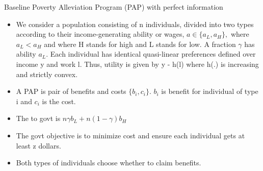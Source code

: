\documentclass{beamer}
\begin{document}
\begin{frame}[allowframebreaks]{Baseline Poverty Alleviation Program (PAP) with perfect information}
\begin{itemize}
    \item We consider a population consisting of n
 individuals, divided into two types according
 to their income-generating ability or wages, $ a \in
 \{a_L, a_H\},$ where $a_L <a_H $ and where H stands
 for high and L stands for low. A fraction $\gamma$
 has ability $a_L$. Each individual has identical quasi-linear preferences defined over income y and work l. Thus, utility is given by y - h(l) where
 h(.) is increasing and strictly convex.
 \item A PAP is pair of benefits and costs $\{b_i , c_i\}$. $b_i$ is benefit for individual of type i and $c_i$ is the cost. 
 \item The to govt is $n \gamma b_L + n(1-\gamma) b_H$
 \item The govt objective is to minimize cost and ensure each individual gets at least z dollars. 
 \item Both types of individuals choose whether to claim benefits.


\end{itemize}
\end{frame}
\end{document}
